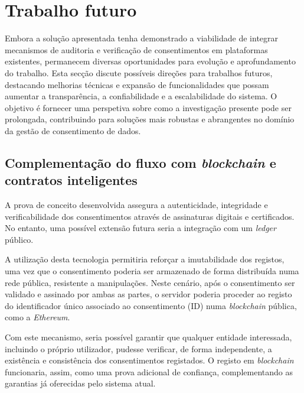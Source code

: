 
\section{Trabalho futuro}

Embora a solução apresentada tenha demonstrado a viabilidade de integrar mecanismos de auditoria e verificação de consentimentos em plataformas existentes, permanecem diversas oportunidades para evolução e aprofundamento do trabalho. Esta secção discute possíveis direções para trabalhos futuros, destacando melhorias técnicas e expansão de funcionalidades que possam aumentar a transparência, a confiabilidade e a escalabilidade do sistema. O objetivo é fornecer uma perspetiva sobre como a investigação presente pode ser prolongada, contribuindo para soluções mais robustas e abrangentes no domínio da gestão de consentimento de dados.

\subsection{Complementação do fluxo com \textit{blockchain} e contratos inteligentes}

A prova de conceito desenvolvida assegura a autenticidade, integridade e verificabilidade dos consentimentos através de assinaturas digitais e certificados. No entanto, uma possível extensão futura seria a integração com um \textit{ledger} público.

A utilização desta tecnologia permitiria reforçar a imutabilidade dos registos, uma vez que o consentimento poderia ser armazenado de forma distribuída numa rede pública, resistente a manipulações. Neste cenário, após o consentimento ser validado e assinado por ambas as partes, o servidor poderia proceder ao registo do identificador único associado ao consentimento (ID) numa \textit{blockchain} pública, como a \textit{Ethereum}.

Com este mecanismo, seria possível garantir que qualquer entidade interessada, incluindo o próprio utilizador, pudesse verificar, de forma independente, a existência e consistência dos consentimentos registados. O registo em \textit{blockchain} funcionaria, assim, como uma prova adicional de confiança, complementando as garantias já oferecidas pelo sistema atual.  

